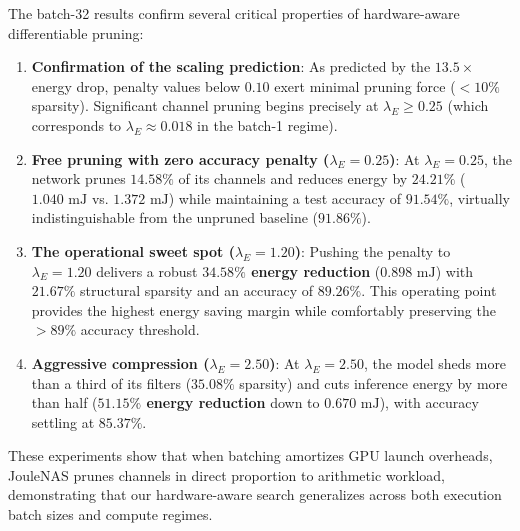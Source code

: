 The batch-32 results confirm several critical properties of hardware-aware differentiable pruning:
\begin{enumerate}
    \item \textbf{Confirmation of the scaling prediction}: As predicted by the $13.5\times$ energy drop, penalty values below $0.10$ exert minimal pruning force ($<10\%$ sparsity). Significant channel pruning begins precisely at $\lambda_E \ge 0.25$ (which corresponds to $\lambda_E \approx 0.018$ in the batch-1 regime).
    \item \textbf{Free pruning with zero accuracy penalty ($\lambda_E = 0.25$)}: At $\lambda_E = 0.25$, the network prunes $14.58\%$ of its channels and reduces energy by \textbf{$24.21\%$} ($1.040\text{ mJ}$ vs. $1.372\text{ mJ}$) while maintaining a test accuracy of $91.54\%$, virtually indistinguishable from the unpruned baseline ($91.86\%$).
    \item \textbf{The operational sweet spot ($\lambda_E = 1.20$)}: Pushing the penalty to $\lambda_E = 1.20$ delivers a robust \textbf{$34.58\%$ energy reduction} ($0.898\text{ mJ}$) with $21.67\%$ structural sparsity and an accuracy of $89.26\%$. This operating point provides the highest energy saving margin while comfortably preserving the $>89\%$ accuracy threshold.
    \item \textbf{Aggressive compression ($\lambda_E = 2.50$)}: At $\lambda_E = 2.50$, the model sheds more than a third of its filters ($35.08\%$ sparsity) and cuts inference energy by more than half (\textbf{$51.15\%$ energy reduction} down to $0.670\text{ mJ}$), with accuracy settling at $85.37\%$.
\end{enumerate}
These experiments show that when batching amortizes GPU launch overheads, JouleNAS prunes channels in direct proportion to arithmetic workload, demonstrating that our hardware-aware search generalizes across both execution batch sizes and compute regimes.




